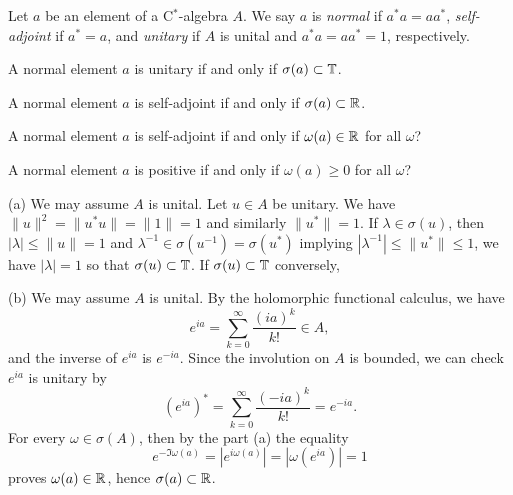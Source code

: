 \documentclass{../../large}
\begin{document}
\begin{prb}
Let $a$ be an element of a C$^*$-algebra $A$.
We say $a$ is \emph{normal} if $a^*a=aa^*$, \emph{self-adjoint} if $a^*=a$, and \emph{unitary} if $A$ is unital and $a^*a=aa^*=1$, respectively.
\begin{parts}
\item A normal element $a$ is unitary if and only if $\sigma(a)\subset\mathbb{T}$.
\item A normal element $a$ is self-adjoint if and only if $\sigma(a)\subset\mathbb{R}$.
\item A normal element $a$ is self-adjoint if and only if $\omega(a)\in\mathbb{R}$ for all $\omega$?
\item A normal element $a$ is positive if and only if $\omega(a)\ge0$ for all $\omega$?
\end{parts}
\end{prb}
\begin{pf}
(a)
We may assume $A$ is unital.
Let $u\in A$ be unitary.
We have $\|u\|^2=\|u^*u\|=\|1\|=1$ and similarly $\|u^*\|=1$.
If $\lambda\in\sigma(u)$, then $|\lambda|\le\|u\|=1$ and $\lambda^{-1}\in\sigma(u^{-1})=\sigma(u^*)$ implying $|\lambda^{-1}|\le\|u^*\|\le1$, we have $|\lambda|=1$ so that $\sigma(u)\subset\mathbb{T}$.
If $\sigma(u)\subset\mathbb{T}$ conversely,

(b)
We may assume $A$ is unital.
By the holomorphic functional calculus, we have
\[e^{ia}=\sum_{k=0}^\infty\frac{(ia)^k}{k!}\in A,\]
and the inverse of $e^{ia}$ is $e^{-ia}$.
Since the involution on $A$ is bounded, we can check $e^{ia}$ is unitary by
\[(e^{ia})^*=\sum_{k=0}^\infty\frac{(-ia)^k}{k!}=e^{-ia}.\]
For every $\omega\in\sigma(A)$, then by the part (a) the equality
\[e^{-\Im\omega(a)}=|e^{i\omega(a)}|=|\omega(e^{ia})|=1\]
proves $\omega(a)\in\mathbb{R}$, hence $\sigma(a)\subset\mathbb{R}$.
\end{pf}
\end{document}
